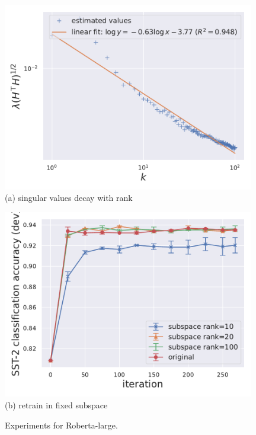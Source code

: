 \begin{figure}[thb]
\begin{center}
\begin{minipage}[t]{0.45\linewidth}
\centering
{\includegraphics[width=0.98\textwidth]{figs/rebuttal/eigenvalue-linfit-large.pdf}}
\footnotesize{(a) singular values decay with rank}
\end{minipage}
\begin{minipage}[t]{0.45\linewidth}
\centering
{\includegraphics[width=0.98\textwidth]{figs/rebuttal/plot2-large.pdf}}
\footnotesize{(b) retrain in fixed subspace}
\end{minipage}
\end{center}
\caption{
Experiments for Roberta-large.
}
\label{fig:pca_roberta_large}
\end{figure}


